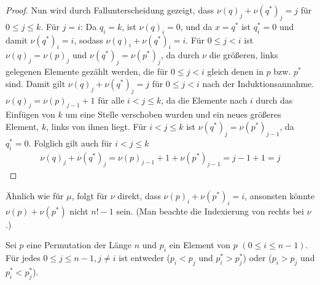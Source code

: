 \documentclass[a4paper, 10pt, ngerman]{article}
\begin{document}
\begin{proof}
    Nun wird durch Fallunterscheidung gezeigt, dass $\nu(q)_j + \nu(q^*)_j = j$ für $0 \le j \le k$. Für $j = i$: Da $q_i = k$, ist $\nu(q)_i = 0$, und da $x = q^*$ ist $q^*_i = 0$ und damit $\nu(q^*)_i = i$, sodass $\nu(q)_i + \nu(q^*)_i = i$. Für $0 \le j < i$ ist $\nu(q)_j = \nu(p)_j$ und $\nu(q^*)_j = \nu(p^*)_j$, da durch $\nu$ die größeren, links gelegenen Elemente gezählt werden, die für $0 \le j < i$ gleich denen in $p$ bzw. $p^*$ sind. Damit gilt $\nu(q)_j + \nu(q^*)_j = j$ für $0 \le j < i$ nach der Induktionsannahme. $\nu(q)_j = \nu(p)_{j - 1} + 1$ für alle $i < j \le k$, da die Elemente nach $i$ durch das Einfügen von $k$ um eine Stelle verschoben wurden und ein neues größeres Element, $k$, links von ihnen liegt. Für $i < j \le k$ ist $\nu(q^*)_j = \nu(p^*)_{j-1}$, da $q^*_i = 0$. Folglich gilt auch für $i < j \le k$
    \begin{align*}
        \nu(q)_j + \nu(q^*)_j = \nu(p)_{j - 1} + 1 + \nu(p^*)_{j - 1} = j - 1 + 1 = j 
    \end{align*}
\end{proof}

Ähnlich wie für $\mu$, folgt für $\nu$ direkt, dass $\nu(p)_i + \nu(p^*)_i = i$, ansonsten könnte $\nu(p) + \nu(p^*)$ nicht $n! - 1$ sein. (Man beachte die Indexierung von rechts bei $\nu$.)

\begin{lemma}
    Sei $p$ eine Permutation der Länge $n$ und $p_i$ ein Element von $p$ $(0 \le i \le n - 1)$. Für jedes $0 \le j \le n-1, j \ne i$ ist entweder ($p_i < p_j$ und $p^*_i > p^*_j$) oder ($p_i > p_j$ und $p^*_i < p^*_j$).
\end{lemma}
\end{document}
